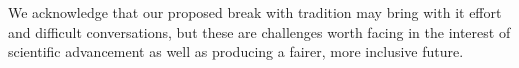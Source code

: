 \documentclass[nonacm,sigconf,review,balance=false]{acmart}
\begin{document}
We acknowledge that our proposed break with tradition may bring with it effort
and difficult conversations, but these are challenges worth facing in the
interest of scientific advancement as well as producing a fairer, more inclusive
future.





\end{document}

